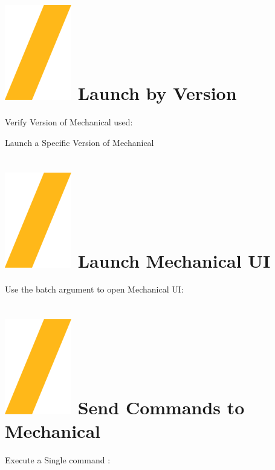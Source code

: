 \documentclass[9pt,landscape]{article}
\begin{document}
\begin{multicols}{3}
\section{\includegraphics[height=\fontcharht\font`\S]{slash.png} Launch by Version}

Verify Version of Mechanical used:


Launch a Specific Version of Mechanical





\section{\includegraphics[height=\fontcharht\font`\S]{slash.png} Launch  Mechanical UI}

Use the batch argument to open Mechanical UI:

\section{\includegraphics[height=\fontcharht\font`\S]{slash.png} Send Commands to Mechanical}
Execute a Single command :


\end{multicols}
\end{document}
